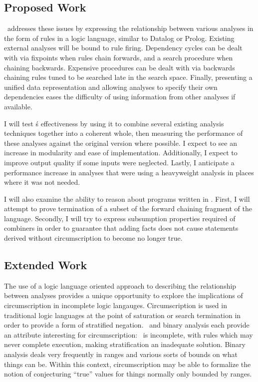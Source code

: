 \subsection{Proposed Work}
\sysname\ addresses these issues by expressing the relationship between various analyses in the form of rules in a logic language, similar to Datalog or Prolog.
Existing external analyses will be bound to rule firing.
Dependency cycles can be dealt with via fixpoints when rules chain forwards, and a search procedure when chaining backwards.
Expensive procedures can be dealt with via backwards chaining rules tuned to be searched late in the search space.
Finally, presenting a unified data representation and allowing analyses to specify their own dependencies eases the difficulty of using information from other analyses if available.

I will test \sysname\'s effectiveness by using it to combine several existing analysis techniques together into a coherent whole, then measuring the performance of these analyses against the original version where possible.
I expect to see an increase in modularity and ease of implementation.
Additionally, I expect to improve output quality if some inputs were neglected.
Lastly, I anticipate a performance increase in analyses that were using a heavyweight analysis in places where it was not needed.

I will also examine the ability to reason about programs written in \sysname.
First, I will attempt to prove termination of a subset of the forward chaining fragment of the language.
Secondly, I will try to express subsumption properties required of combiners in order to guarantee that adding facts does not cause statements derived without circumscription to become no longer true.
\subsection{Extended Work}
The use of a logic language oriented approach to describing the relationship between analyses provides a unique opportunity to explore the implications of circumscription in incomplete logic langauges.
Circumscription is used in traditional logic languages at the point of saturation or search termination in order to provide a form of stratified negation.
\sysname\ and binary analysis each provide an attribute interesting for circumscription:
\sysname\ is incomplete, with rules which may never complete execution, making stratification an inadequate solution.
Binary analysis deals very frequently in ranges and various sorts of bounds on what things can be.
Within this context, circumscription may be able to formalize the notion of conjecturing ``true'' values for things normally only bounded by ranges.

